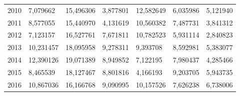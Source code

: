 \begin{table}
\begin{tabular}{p{1cm}p{2cm}p{2cm}p{2cm}p{2cm}p{2cm}p{2cm}}
 2010 &                               7,079662 &         15,496306 &                              3,877801 &                           12,582649 &     6,035986 & 5,121940 \\
 2011 &                               8,577055 &         15,440970 &                              4,131619 &                           10,560382 &     7,487731 & 3,841312 \\
 2012 &                               7,123157 &         16,527761 &                              7,671811 &                           10,782523 &     5,931114 & 2,840823 \\
 2013 &                              10,231457 &         18,095958 &                              9,278311 &                            9,393708 &     8,592981 & 5,383077 \\
 2014 &                              12,390126 &         19,071389 &                              8,949852 &                            7,122195 &     7,980437 & 4,285466 \\
 2015 &                               8,465539 &         18,127467 &                              8,801816 &                            4,166193 &     9,203705 & 5,943735 \\
 2016 &                              10,867036 &         16,166768 &                              9,090995 &                           10,157526 &     7,626238 & 6,738006 \\
\bottomrule
\end{tabular}
\end{table}
